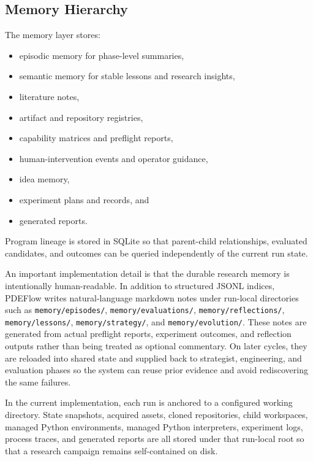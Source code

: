 \documentclass[11pt]{article}
\begin{document}
\subsection{Memory Hierarchy}
The memory layer stores:
\begin{itemize}[leftmargin=1.5em]
  \item episodic memory for phase-level summaries,
  \item semantic memory for stable lessons and research insights,
  \item literature notes,
  \item artifact and repository registries,
  \item capability matrices and preflight reports,
  \item human-intervention events and operator guidance,
  \item idea memory,
  \item experiment plans and records, and
  \item generated reports.
\end{itemize}

Program lineage is stored in SQLite so that parent-child relationships, evaluated candidates, and outcomes can be queried independently of the current run state.

An important implementation detail is that the durable research memory is intentionally human-readable. In addition to structured JSONL indices, PDEFlow writes natural-language markdown notes under run-local directories such as \texttt{memory/episodes/}, \texttt{memory/evaluations/}, \texttt{memory/reflections/}, \texttt{memory/lessons/}, \texttt{memory/strategy/}, and \texttt{memory/evolution/}. These notes are generated from actual preflight reports, experiment outcomes, and reflection outputs rather than being treated as optional commentary. On later cycles, they are reloaded into shared state and supplied back to strategist, engineering, and evaluation phases so the system can reuse prior evidence and avoid rediscovering the same failures.

In the current implementation, each run is anchored to a configured working directory. State snapshots, acquired assets, cloned repositories, child workspaces, managed Python environments, managed Python interpreters, experiment logs, process traces, and generated reports are all stored under that run-local root so that a research campaign remains self-contained on disk.
\end{document}
